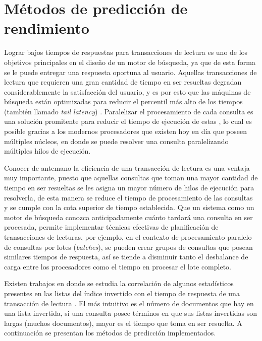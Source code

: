 \chapter{Métodos de predicción de rendimiento}
\label{cap:prediccion}
Lograr bajos tiempos de respuestas para transacciones de lectura es uno de los objetivos principales en el diseño de un motor de búsqueda, ya que de esta forma se le puede entregar una respuesta oportuna al usuario. Aquellas transacciones de lectura que requieren una gran cantidad de tiempo en ser resueltas degradan considerablemente la satisfacción del usuario, y es por esto que las máquinas de búsqueda están optimizadas para reducir el percentil más alto de los tiempos (también llamado \textit{tail latency}) \citep{Jeon:2014}. Paralelizar el procesamiento de cada consulta es una solución promitente para reducir el tiempo de ejecución de estas \citep{Jeon:2013, Tatikonda:2011}, lo cual es posible gracias a los modernos procesadores que existen hoy en día que poseen múltiples núcleos, en donde se puede resolver una consulta paralelizando múltiples hilos de ejecución.

Conocer de antemano la eficiencia de una transacción de lectura es una ventaja muy importante, puesto que aquellas consultas que toman una mayor cantidad de tiempo en ser resueltas se les asigna un mayor número de hilos de ejecución para resolverla, de esta manera se reduce el tiempo de procesamiento de las consultas y se cumple con la cota superior de tiempo establecida. Que un sistema como un motor de búsqueda conozca anticipadamente cuánto tardará una consulta en ser procesada, permite implementar técnicas efectivas de planificación de transacciones de lecturas, por ejemplo, en el contexto de procesamiento paralelo de consultas por lotes (\textit{batches}), se pueden crear grupos de consultas que posean similares tiempos de respuesta, así se tiende a disminuir tanto el desbalance de carga entre los procesadores como el tiempo en procesar el lote completo.

Existen trabajos en donde se estudia la correlación de algunos estadísticos presentes en las listas del índice invertido con el tiempo de respuesta de una transacción de lectura \citep{Macdonald:2012, Hauff:2010, He:2004}. El más intuitivo es el número de documentos que hay en una lista invertida, si una consulta posee términos en que sus listas invertidas son largas (muchos documentos), mayor es el tiempo que toma en ser resuelta. A continuación se presentan los métodos de predicción implementados.  


